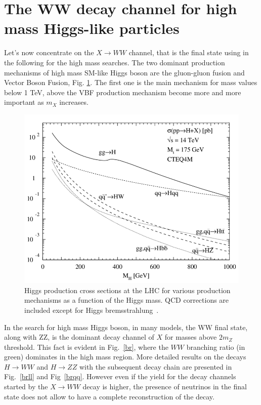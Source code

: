 \section{The WW decay channel for high mass Higgs-like particles}
Let’s now concentrate on the $X \to WW$ channel, that is the  final state using in the following  for the high mass searches.
The two dominant production mechanisms of high mass SM-like Higgs boson are the
gluon-gluon fusion and Vector Boson Fusion,  Fig. \ref{prod}. 
The first one is the main mechanism for mass values below 1 TeV, above the VBF production mechanism become more and more important as $m_X$ increases.
\begin{figure}
\centering
\includegraphics[scale= 0.4]{../Cap1/Higgs-production-cross-sections-at-the-LHC-for-various-production-mechanisms-as-a}
\caption{Higgs production cross sections at the LHC for various production mechanisms as a function of the Higgs mass. QCD corrections are included except for Higgs bremsstrahlung~\cite{Djouadi2004}.}
\label{prod}
\end{figure}
In the search for high mass Higgs boson, in many models, the WW final state, along with ZZ, is the dominant decay channel of $X$ for masses above $2m_Z$ threshold. This fact is evident in Fig.~\ref{br}, where the $WW$ branching ratio (in green) dominates in the high mass region. 
More detailed results on the decays $H \to WW$ and $H \to ZZ $ with the subsequent decay chain are presented in Fig.~\ref{brll} and Fig~\ref{brqq}.
However even if the yield for the decay channels started by the $X \to WW$ decay is higher,  the
presence of neutrinos in the final state does not allow to have a complete reconstruction of the decay.
